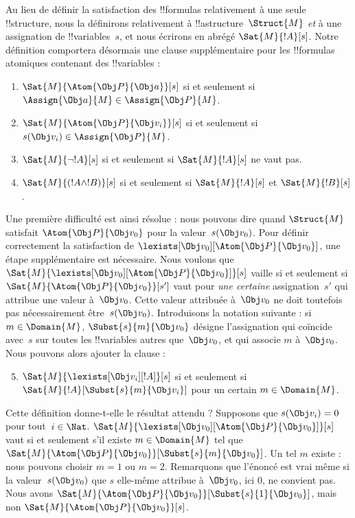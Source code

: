 \documentclass[11pt,a4paper,openany]{memoir}
\begin{document}
Au lieu de définir la satisfaction des !!{formula}s relativement à une
seule !!{structure}, nous la définirons relativement à
!!a{structure}~$\Struct{M}$ \emph{et} à une assignation de
!!{variable}s~$s$, et nous écrirons en abrégé $\Sat{M}{!A}[s]$. Notre
définition comportera désormais une clause supplémentaire pour les
!!{formula}s atomiques contenant des !!{variable}s :
\begin{enumerate}
  \item $\Sat{M}{\Atom{\Obj P}{\Obj a}}[s]$ si et seulement si
  $\Assign{\Obj a}{M} \in \Assign{\Obj P}{M}$.
  \item $\Sat{M}{\Atom{\Obj P}{\Obj v_i}}[s]$ si et seulement si
  $s(\Obj v_i) \in \Assign{\Obj P}{M}$.
  \item $\Sat{M}{\lnot !A}[s]$ si et seulement si
  $\Sat{M}{!A}[s]$ ne vaut pas.
  \item $\Sat{M}{(!A \land !B)}[s]$ si et seulement si
  $\Sat{M}{!A}[s]$ et $\Sat{M}{!B}[s]$.
\end{enumerate}
Une première difficulté est ainsi résolue : nous pouvons dire quand
$\Struct{M}$ satisfait $\Atom{\Obj P}{\Obj v_0}$ pour la
valeur~$s(\Obj v_0)$. Pour définir correctement la satisfaction de
$\lexists[\Obj v_0][\Atom{\Obj P}{\Obj v_0}]$, une étape supplémentaire
est nécessaire. Nous voulons que
$\Sat{M}{\lexists[\Obj v_0][\Atom{\Obj P}{\Obj v_0}]}[s]$ vaille si et
seulement si
$\Sat{M}{\Atom{\Obj P}{\Obj v_0}}[s']$ vaut pour \emph{une certaine}
assignation~$s'$ qui attribue une valeur à~$\Obj v_0$. Cette valeur
attribuée à~$\Obj v_0$ ne doit toutefois pas nécessairement
être~$s(\Obj v_0)$. Introduisons la
notation suivante : si $m \in \Domain{M}$,
$\Subst{s}{m}{\Obj v_0}$ désigne l'assignation qui coïncide avec~$s$
sur toutes les !!{variable}s autres que~$\Obj v_0$, et qui associe
$m$ à~$\Obj v_0$. Nous pouvons alors ajouter la clause :
\begin{enumerate}\setcounter{enumi}{4}
  \item $\Sat{M}{\lexists[\Obj v_i][!A]}[s]$ si et seulement si
  $\Sat{M}{!A}[\Subst{s}{m}{\Obj v_i}]$ pour un certain
  $m \in \Domain{M}$.
\end{enumerate}
Cette définition donne-t-elle le résultat attendu ? Supposons que
$s(\Obj v_i) = 0$ pour tout~$i \in \Nat$.
$\Sat{M}{\lexists[\Obj v_0][\Atom{\Obj P}{\Obj v_0}]}[s]$ vaut si et
seulement s'il existe $m \in \Domain{M}$ tel que
$\Sat{M}{\Atom{\Obj P}{\Obj v_0}}[\Subst{s}{m}{\Obj v_0}]$.
Un tel $m$ existe : nous pouvons choisir $m = 1$ ou $m = 2$. Remarquons
que l'énoncé est vrai même si la valeur~$s(\Obj v_0)$ que $s$
elle-même attribue à~$\Obj v_0$, ici $0$, ne convient pas. Nous avons
$\Sat{M}{\Atom{\Obj P}{\Obj v_0}}[\Subst{s}{1}{\Obj v_0}]$, mais non
$\Sat{M}{\Atom{\Obj P}{\Obj v_0}}[s]$.
\end{document}
